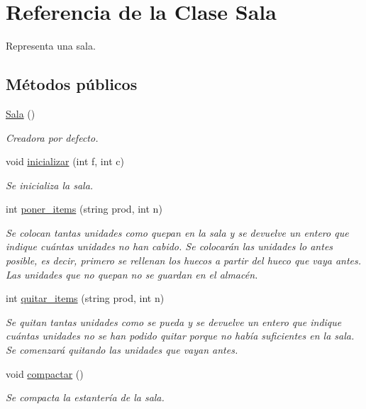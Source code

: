 \hypertarget{class_sala}{}\section{Referencia de la Clase Sala}
\label{class_sala}


Representa una sala.  


\subsection*{Métodos públicos}
\begin{DoxyCompactItemize}
\item 
\hyperlink{class_sala_afcf1b7b533e776b043ce8fb13c6268ca}{Sala} ()
\begin{DoxyCompactList}\small\item\em Creadora por defecto. \end{DoxyCompactList}\item 
void \hyperlink{class_sala_a0a183a0a093d33d286140b3c4d0e1f3e}{inicializar} (int f, int c)
\begin{DoxyCompactList}\small\item\em Se inicializa la sala. \end{DoxyCompactList}\item 
int \hyperlink{class_sala_a464637049bee3450e4a16ee60893d493}{poner\+\_\+items} (string prod, int n)
\begin{DoxyCompactList}\small\item\em Se colocan tantas unidades como quepan en la sala y se devuelve un entero que indique cuántas unidades no han cabido. Se colocarán las unidades lo antes posible, es decir, primero se rellenan los huecos a partir del hueco que vaya antes. Las unidades que no quepan no se guardan en el almacén. \end{DoxyCompactList}\item 
int \hyperlink{class_sala_a54e9146a95f5fbf48de3c29dda295848}{quitar\+\_\+items} (string prod, int n)
\begin{DoxyCompactList}\small\item\em Se quitan tantas unidades como se pueda y se devuelve un entero que indique cuántas unidades no se han podido quitar porque no había suficientes en la sala. Se comenzará quitando las unidades que vayan antes. \end{DoxyCompactList}\item 
void \hyperlink{class_sala_aac11486a22560bdcdb7771e9692cfa75}{compactar} ()
\begin{DoxyCompactList}\small\item\em Se compacta la estantería de la sala. \end{DoxyCompactList}\item 

\end{DoxyCompactItemize}

